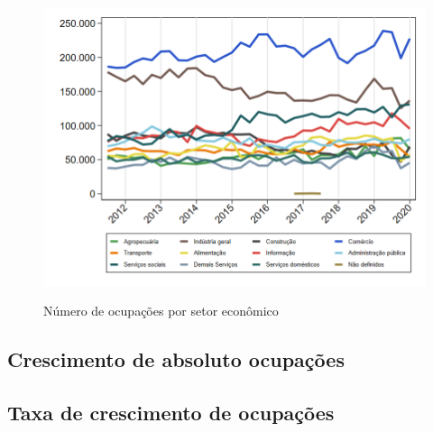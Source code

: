 \documentclass[10pt]{beamer}
\begin{document}
\begin{frame}
\textit{\hyperlink{indice_principal_amz_manaus}{}}
\begin{figure}
  \centering
  \includegraphics[width=.85\linewidth]{./../analysis/output/_amz_manaus_importancia_relativa.png}
  \label{_amz_manaus_importancia_relativa}
  \caption{{Número de ocupações por setor econômico}}
\end{figure}
\end{frame}

\subsection{Crescimento de absoluto ocupações}

\begin{frame}
\textit{\hyperlink{indice_principal_amz_manaus}{}}

\end{frame}

\begin{frame}
\textit{\hyperlink{indice_principal_amz_manaus}{}}

\end{frame}

\begin{frame}
\textit{\hyperlink{indice_principal_amz_manaus}{}}

\end{frame}

\subsection{Taxa de crescimento de ocupações}
\end{document}
